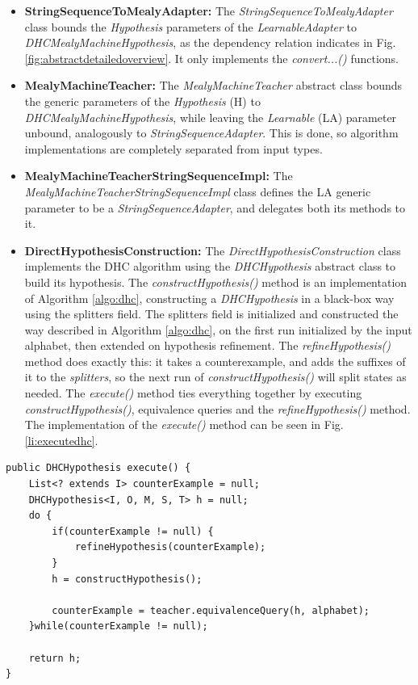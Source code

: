 \begin{itemize}
	\item \textbf{StringSequenceToMealyAdapter:} The \emph{StringSequenceToMealyAdapter} class bounds the \emph{Hypothesis} parameters of the \emph{LearnableAdapter} to \emph{DHCMealyMachineHypothesis}, as the dependency relation indicates in Fig. \ref{fig:abstractdetailedoverview}. It only implements the \emph{convert...()} functions.

	\item \textbf{MealyMachineTeacher:} The \emph{MealyMachineTeacher} abstract class bounds the generic parameters of the \emph{Hypothesis} (H) to \emph{DHCMealyMachineHypothesis}, while leaving the \emph{Learnable} (LA) parameter unbound, analogously to \emph{StringSequenceAdapter}. This is done, so algorithm implementations are completely separated from input types. 
	\item \textbf{MealyMachineTeacherStringSequenceImpl:} The \emph{MealyMachineTeacherStringSequenceImpl} class defines the LA generic parameter to be a \emph{StringSequenceAdapter}, and delegates both its methods to it.
	 
	\item \textbf{DirectHypothesisConstruction:} The \emph{DirectHypothesisConstruction} class implements the DHC algorithm using the \emph{DHCHypothesis} abstract class to build its hypothesis. The \emph{constructHypothesis()} method is an implementation of Algorithm \ref{algo:dhc}, constructing a \emph{DHCHypothesis} in a black-box way using the splitters field. The splitters field is initialized and constructed the way described in Algorithm \ref{algo:dhc}, on the first run initialized by the input alphabet, then extended on hypothesis refinement. The \emph{refineHypothesis()} method does exactly this: it takes a counterexample, and adds the suffixes of it to the \emph{splitters}, so the next run of \emph{constructHypothesis()} will split states as needed. The \emph{execute()} method ties everything together by executing \emph{constructHypothesis()}, equivalence queries and the \emph{refineHypothesis()} method. The implementation of the \emph{execute()} method can be seen in Fig. \ref{li:executedhc}.
\end{itemize}

\begin{lstlisting}[caption=The \emph{execute()} function of the DHC algorithm implementation described in Section \ref{item:stringsequencelearnable}s \emph{DirectHypothesisConstruction} item.,label=li:executedhc]
public DHCHypothesis execute() {
	List<? extends I> counterExample = null;
	DHCHypothesis<I, O, M, S, T> h = null;
	do {
		if(counterExample != null) {
			refineHypothesis(counterExample);
		}
		h = constructHypothesis();
		
		counterExample = teacher.equivalenceQuery(h, alphabet);
	}while(counterExample != null);
	
	return h;
}
\end{lstlisting}

